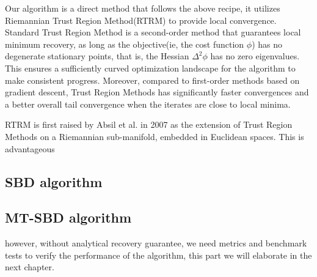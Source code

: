 Our algorithm is a direct method that follows the above recipe, it utilizes Riemannian Trust Region Method(RTRM) to provide local convergence. Standard Trust Region Method is a second-order method that guarantees local minimum recovery, as long as the objective(ie, the cost function $\phi$) has no degenerate stationary points, that is, the Hessian $\Delta^2\phi$ has no zero eigenvalues. This ensures a sufficiently curved optimization landscape for the algorithm to make consistent progress. Moreover, compared to first-order methods based on gradient descent, Trust Region Methods has significantly faster convergences and a better overall tail convergence when the iterates are close to local minima. 

\ac{RTRM} is first raised by Absil et al. in 2007 as the extension of Trust Region Methods on a Riemannian sub-manifold, embedded in Euclidean spaces. This is advantageous 


\subsection{SBD algorithm}

\subsection{MT-SBD algorithm}
however, without analytical recovery guarantee, we need metrics and benchmark tests to verify the performance of the algorithm, this part we will elaborate in the next chapter. 
